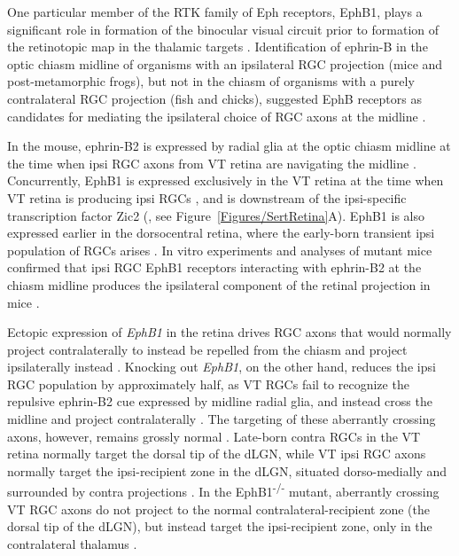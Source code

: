 One particular member of the RTK family of Eph receptors, EphB1, plays a significant role in formation of the binocular visual circuit prior to formation of the retinotopic map in the thalamic targets \cite{williams2003ephrin,petros2008retinal,lee2008zic2}.
Identification of ephrin-B in the optic chiasm midline of organisms with an ipsilateral RGC projection (mice and post-metamorphic frogs), but not in the chiasm of organisms with a purely contralateral RGC projection (fish and chicks), suggested EphB receptors as candidates for mediating the ipsilateral choice of RGC axons at the midline \cite{nakagawa2000ephrin}.

In the mouse, ephrin-B2 is expressed by radial glia at the optic chiasm midline at the time when ipsi RGC axons from VT retina are navigating the midline \cite{williams2003ephrin}.
Concurrently, EphB1 is expressed exclusively in the VT retina at the time when VT retina is producing ipsi RGCs \cite{williams2003ephrin}, and is downstream of the ipsi-specific transcription factor Zic2 (, see Figure~\ref{Figures/SertRetina}A).
EphB1 is also expressed earlier in the dorsocentral retina, where the early-born transient ipsi population of RGCs arises \cite{drager1985birth,williams2003ephrin}.
In vitro experiments and analyses of mutant mice confirmed that ipsi RGC EphB1 receptors interacting with ephrin-B2 at the chiasm midline produces the ipsilateral component of the retinal projection in mice \cite{williams2003ephrin,petros2009specificity,petros2010ephrin,chenaux2011forward}.

Ectopic expression of \emph{EphB1} in the retina drives RGC axons that would normally project contralaterally to instead be repelled from the chiasm and project ipsilaterally instead \cite{petros2009specificity}.
Knocking out \emph{EphB1}, on the other hand, reduces the ipsi RGC population by approximately half, as VT RGCs fail to recognize the repulsive ephrin-B2 cue expressed by midline radial glia, and instead cross the midline and project contralaterally \cite{williams2003ephrin}.
The targeting of these aberrantly crossing axons, however, remains grossly normal \cite{rebsam2009switching}.
Late-born contra RGCs in the VT retina normally target the dorsal tip of the dLGN, while VT ipsi RGC axons normally target the ipsi-recipient zone in the dLGN, situated dorso-medially and surrounded by contra projections \cite{pfeiffenberger2006ephrin,rebsam2009switching}.
In the EphB1\textsuperscript{-/-} mutant, aberrantly crossing VT RGC axons do not project to the normal contralateral-recipient zone (the dorsal tip of the dLGN), but instead target the ipsi-recipient zone, only in the contralateral thalamus \cite{rebsam2009switching}.

